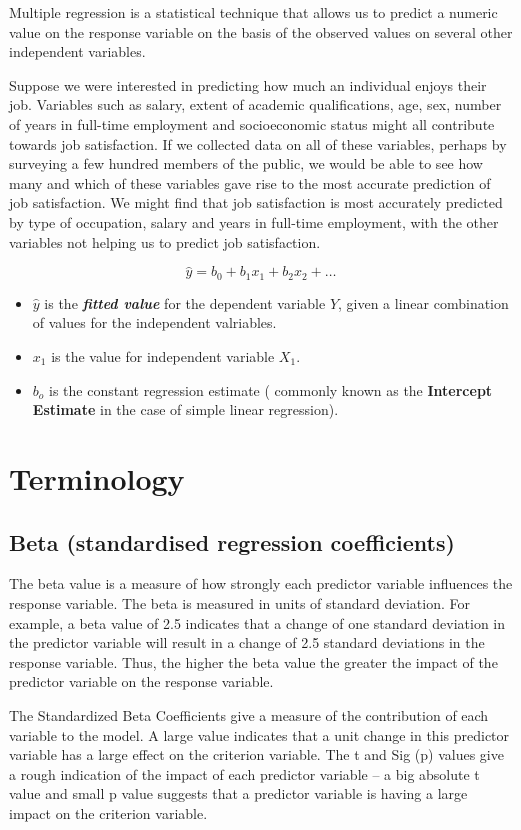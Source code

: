 Multiple regression is a statistical technique that allows us to predict a numeric value on the response variable on the basis of the observed values on several other independent variables.

Suppose we were interested in predicting how much an individual enjoys their job. Variables such as salary, extent of academic qualifications, age, sex, number of years in full-time employment and socioeconomic status might all contribute towards job satisfaction. If we collected data on all of these variables, perhaps by surveying a few hundred members of the public, we would be able to see how many and which of these variables gave rise to the most accurate prediction of job satisfaction. We might find that job satisfaction is most accurately predicted by type of occupation, salary and years in full-time employment, with the other variables not helping us to predict job satisfaction.

\[\hat{y} = b_0 + b_1x_1 + b_2x_2 + \ldots \]

\begin{itemize}
	\item $\hat{y}$ is the \textbf{\textit{fitted value}} for the dependent variable \textbf{$Y$}, given a linear combination of values for the independent valriables.
	
	\item $x_1$ is the value for independent variable \textbf{$X_1$}.
	\item $b_o$ is the constant regression estimate ( commonly known as the \textbf{Intercept Estimate} in the case of simple linear regression).
\end{itemize}
\newpage


\section{Terminology}
\subsection{Beta (standardised regression coefficients)}
The beta value is a measure of how strongly each predictor variable influences the
response variable. The beta is measured in units of standard deviation. For example,
a beta value of 2.5 indicates that a change of one standard deviation in the predictor
variable will result in a change of 2.5 standard deviations in the response variable.
Thus, the higher the beta value the greater the impact of the predictor variable on
the response variable.


The Standardized Beta
Coefficients give a measure of the
contribution of each variable to
the model. A large value indicates
that a unit change in this
predictor variable has a large
effect on the criterion variable.
The t and Sig (p) values give a
rough indication of the impact of
each predictor variable – a big
absolute t value and small p value
suggests that a predictor variable
is having a large impact on the
criterion variable.

